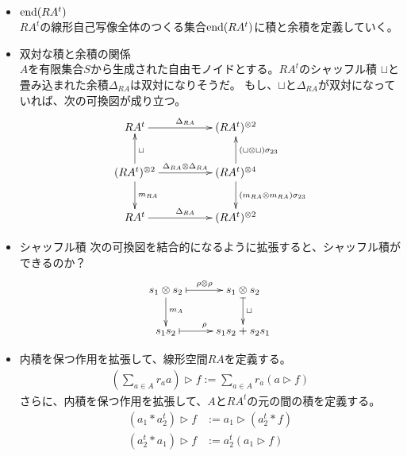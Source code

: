	\begin{todo}[この後の予定]\label{todo:この後の予定} %
		\begin{itemize}
			\item $\operatorname{end}(RA^t)$ \\ %
				$RA^t$の線形自己写像全体のつくる集合$\operatorname{end}(RA^t)$に積と余積を定義していく。
			\item 双対な積と余積の関係　\\
			$A$を有限集合$S$から生成された自由モノイドとする。$RA^t$のシャッフル積
			$\sqcup$と畳み込まれた余積$\Delta_{RA}$は双対になりそうだ。
			もし、$\sqcup$と$\Delta_{RA}$が双対になっていれば、次の可換図が成り立つ。
			\begin{equation}\xymatrix@C+2pc{
				RA^t \ar[r]^{\Delta_{RA}}& (RA^t)^{\otimes2} \\
				(RA^t)^{\otimes2} \ar[d]^{m_{RA}} \ar[u]_{\sqcup} \ar[r]^{\Delta_{RA}\otimes \Delta_{RA}} 
				& (RA^t)^{\otimes4} \ar[d]^{(m_{RA}\otimes m_{RA})\sigma_{23}} \ar[u]_{(\sqcup\otimes \sqcup)\sigma_{23}} \\
				RA^t \ar[r]^{\Delta_{RA}} & (RA^t)^{\otimes2} \\
			}\end{equation}
			\item シャッフル積 %
				次の可換図を結合的になるように拡張すると、シャッフル積ができるのか？
				\begin{equation}\xymatrix{
					s_1\otimes s_2 \ar@{|->}[r]^{\rho\otimes \rho} \ar[d]^{m_A} 
					& s_1\otimes s_2 \ar@{|->}[d]^{\sqcup} \\
					s_1s_2 \ar@{|->}[r]^{\rho} & s_1s_2+s_2s_1 \\ 
				}\end{equation}
			\item 内積を保つ作用を拡張して、線形空間$RA$を定義する。
			\begin{equation*}\begin{split} %
				(\sum_{a\in A}r_aa)\rhd f := \sum_{a\in A} r_a(a\rhd f)
			\end{split}\end{equation*} %
			さらに、内積を保つ作用を拡張して、$A$と$RA^t$の元の間の積を定義する。
			\begin{equation*}\begin{split} %
				(a_1*a_2^t)\rhd f &:= a_1\rhd (a_2^t*f) \\
				(a_2^t*a_1)\rhd f &:= a_2^t(a_1\rhd f) \\
			\end{split}\end{equation*} %

\end{itemize}
\end{todo}
